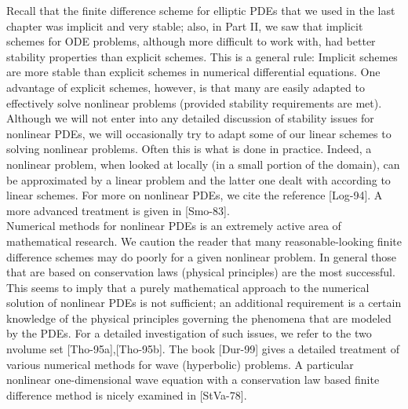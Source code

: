 \documentclass[../main.tex]{subfiles}
\begin{document}
{{Recall that the finite difference scheme for elliptic PDEs that we used in the last chapter was implicit and very stable; also, in Part II, we saw that implicit schemes for ODE problems, although more difficult to work with, had better stability properties than explicit schemes. This is a general rule: Implicit schemes are more stable than explicit schemes in numerical differential equations. One advantage of explicit schemes, however, is that many are easily adapted to effectively solve nonlinear problems (provided stability requirements are met). Although we will not enter into any detailed discussion of stability issues for nonlinear PDEs, we will occasionally try to adapt some of our linear schemes to solving nonlinear problems. Often this is what is done in practice. Indeed, a nonlinear problem, when looked at locally (in a small portion of the domain), can be approximated by a linear problem and the latter one dealt with according to linear schemes. For more on nonlinear PDEs, we cite the reference [Log-94]. A more advanced treatment is given in [Smo-83].
\\

Numerical methods for nonlinear PDEs is an extremely active area of mathematical research. We caution the reader that many reasonable-looking finite difference schemes may do poorly for a given nonlinear problem. In general those that are based on conservation laws (physical principles) are the most successful. This seems to imply that a purely mathematical approach to the numerical solution of nonlinear PDEs is not sufficient; an additional requirement is a certain knowledge of the physical principles governing the phenomena that are modeled by the PDEs. For a detailed investigation of such issues, we refer to the two nvolume set [Tho-95a],[Tho-95b]. The book [Dur-99] gives a detailed treatment of various numerical methods for wave (hyperbolic) problems. A particular nonlinear one-dimensional wave equation with a conservation law based finite difference method is nicely examined in [StVa-78].
\\

}}
\end{document}
